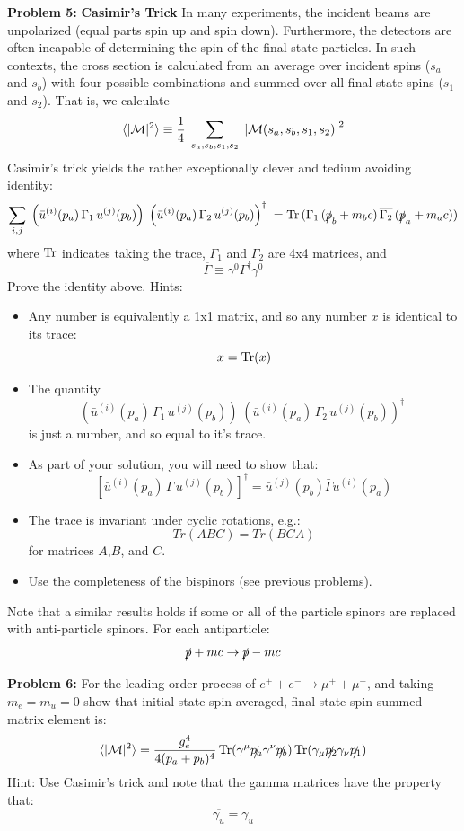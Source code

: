 \documentclass[12pt]{article}
\DeclareMathOperator{\Tr}{Tr}
\begin{document}
\noindent
{\bf Problem 5:} {\bf Casimir's Trick} In many experiments, the
incident beams are unpolarized (equal parts spin up and spin down).
Furthermore, the detectors are often incapable of determining the spin
of the final state particles.  In such contexts, the cross section is
calculated from an average over incident spins ($s_a$ and $s_b$) with four possible combinations and summed over all final state spins ($s_1$ and $s_2$).  That is, we calculate
$$ \braket{|\mathcal{M}|^2} \equiv \frac{1}{4} \; \sum_{s_a,s_b,s_1,s_2}
\; \left| \mathcal{M}(s_a,s_b,s_1,s_2)\right|^2$$
Casimir's trick yields the rather exceptionally clever and tedium avoiding identity:
$$\sum_{i,j} \;
\left( \bar{u}^{(i)}(p_a) \, \Gamma_1 \, u^{(j)}(p_b) \right) \; 
\left( \bar{u}^{(i)}(p_a) \, \Gamma_2 \, u^{(j)}(p_b) \right)^\dagger \;
= {\rm Tr}\,(\Gamma_1 \, (\slashed{p}_b + m_b c) \, \overline{\Gamma_2} \, (\slashed{p}_a + m_a c) )$$
where $\rm Tr$ indicates taking the trace, $\Gamma_1$ and $\Gamma_2$ are 4x4 matrices, and
$$\overline{\Gamma} \equiv \gamma^0 \Gamma^\dagger \gamma^0$$
Prove the identity above.  Hints:
\begin{itemize}
\item Any number is equivalently a 1x1 matrix, and so any number $x$ is identical to its trace:
$$x = {\rm Tr}(x)$$
\item The quantity
$$\left( \bar{u}^{(i)}(p_a) \, \Gamma_1 \, u^{(j)}(p_b) \right) \; 
\left( \bar{u}^{(i)}(p_a) \, \Gamma_2 \, u^{(j)}(p_b) \right)^\dagger \;$$
is just a number, and so equal to it's trace.
\item As part of your solution, you will need to show that:
$$[\bar{u}^{(i)}(p_a) \, \Gamma \, u^{(j)}(p_b)]^\dagger
= \bar{u}^{(j)}(p_b) \bar{\Gamma} u^{(i)}(p_a)$$
\item The trace is invariant under cyclic rotations, e.g.:
$$Tr(ABC) = Tr(BCA)$$
  for matrices $A$,$B$, and $C$.
\item Use the completeness of the bispinors (see previous problems).
\end{itemize}  

Note that a similar results holds if some or all of the particle spinors are replaced with anti-particle spinors.  For each antiparticle:
$$\slashed{p}+mc \to \slashed{p}-mc$$


\newpage 

\noindent
{\bf Problem 6:} For the leading order process of $e^+ + e^- \to \mu^+ + \mu^- $, and taking $m_e = m_u = 0$ show that initial state spin-averaged, final state spin summed matrix element is:
$$\braket{|\mathcal{M}|^2} = \frac{g_e^4}{4(p_a+p_b)^4}
\Tr(\gamma^\mu\slashed{p_a}\gamma^\nu\slashed{p_b})
\Tr(\gamma_\mu\slashed{p_2}\gamma_\nu\slashed{p_1})$$
Hint:  Use Casimir's trick and note that the gamma matrices have the property that:
$$\overline{\gamma_u} = \gamma_u$$
~\\[5pt]
\end{document}
